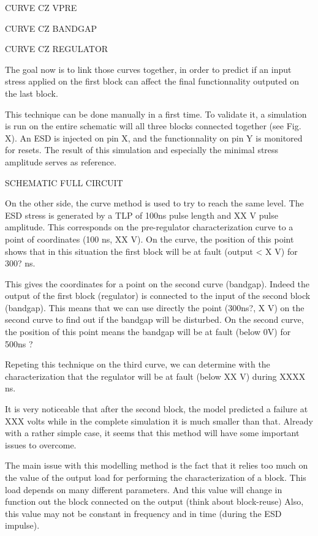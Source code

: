 CURVE CZ VPRE

CURVE CZ BANDGAP

CURVE CZ REGULATOR

The goal now is to link those curves together, in order to predict if an input
stress applied on the first block can affect the final functionnality outputed
on the last block.

This technique can be done manually in a first time. To validate it,
a simulation is run on the entire schematic will all three blocks
connected together (see Fig. X).
An ESD is injected on pin X, and the functionnality on pin Y is monitored for resets.
The result of this simulation and especially the minimal stress amplitude serves as reference.

SCHEMATIC FULL CIRCUIT

On the other side, the curve method is used to try to reach the same level.
The ESD stress is generated by a TLP of 100ns pulse length and XX V pulse amplitude.
This corresponds on the pre-regulator characterization curve to a point of coordinates (100 ns, XX V).
On the curve, the position of this point shows that in this situation the first block will be at fault (output < X V) for 300? ns.

This gives the coordinates for a point on the second curve (bandgap).
Indeed the output of the first block (regulator) is connected to the input of the second block (bandgap).
This means that we can use directly the point (300ns?, X V) on the second curve to find out if the bandgap will be disturbed.
On the second curve, the position of this point means the bandgap will be at fault (below 0V) for 500ns ?

Repeting this technique on the third curve, we can determine with the characterization that the regulator will be at
fault (below XX V) during XXXX ns.

It is very noticeable that after the second block, the model predicted a failure at
XXX volts while in the complete simulation it is much smaller than that.
Already with a rather simple case, it seems that this method will have some important issues to overcome.

The main issue with this modelling method is the fact that it relies too much
on the value of the output load for performing the characterization of a block.
This load depends on many different parameters.
And this value will change in function out the block connected on the output (think about block-reuse)
Also, this value may not be constant in frequency and in time (during the ESD impulse).

